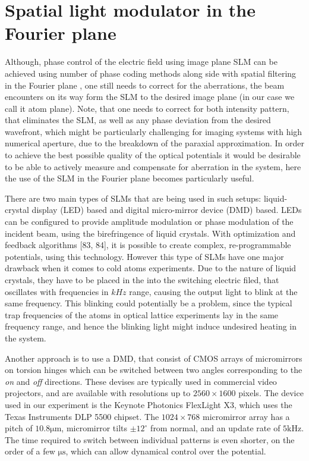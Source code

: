 \section{Spatial light modulator in the Fourier plane}
Although, phase control of the electric field using image plane SLM can be achieved using number of phase coding methods along side with spatial filtering in the Fourier plane \cite{Lee1970, Goorden2014}, one still needs to correct for the aberrations, the beam encounters on its way form the SLM to the desired image plane (in our case we call it atom plane). Note, that one needs to correct for both intensity pattern, that eliminates the SLM, as well as any phase deviation from the desired wavefront, which might be particularly challenging for imaging systems with high numerical aperture, due to the breakdown of the paraxial approximation. In order to achieve the best possible quality of the optical potentials it would be desirable to be able to actively measure and compensate for aberration in the system, here the use of the SLM in the Fourier plane becomes particularly useful.

There are two main types of SLMs that are being used in such setups: liquid-crystal display (LED) based and digital micro-mirror device (DMD) based. LEDs can be configured to provide amplitude modulation or phase modulation of the incident beam, using the birefringence of liquid crystals. With optimization and feedback algorithms [83, 84], it is possible to create complex, re-programmable potentials, using this technology. However this type of SLMs have one major drawback when it comes to cold atoms experiments. Due to the nature of liquid crystals, they have to be placed in the into the switching electric filed, that oscillates with frequencies in $kHz$ range, causing the output light to blink at the same frequency. This blinking could potentially be a problem, since the typical trap frequencies of the atoms in optical lattice experiments lay in the same frequency range, and hence the blinking light might induce undesired heating in the system.

Another approach is to use a DMD, that consist of CMOS arrays of micromirrors on torsion hinges which can be switched
between two angles corresponding to the \textit{on} and \textit{off} directions. These devises are typically used in commercial video projectors, and are available with resolutions up to $2560 \times 1600$ pixels. The device used in our experiment is the Keynote Photonics FlexLight X3, which uses the Texas Instruments DLP 5500 chipset. The $1024 \times 768$ micromirror array has a pitch of $10.8 \mathrm{\mu m}$, micromirror tilts $\pm 12^{\circ}$ from normal, and an update rate of $5 \mathrm{kHz}$. The time required to switch between individual patterns is even shorter, on the order of a few $\mathrm{\mu s}$, which can allow dynamical control over the potential.

